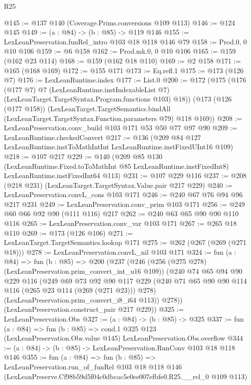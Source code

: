 \begin{lexlean}{R25}
\begin{coremodule}
@145 := @137 @140 (Coverage.Prims.conversions @109 @113)
@146 := @124 @145
@149 := (a : @84) -> (b : @85) -> @119 @146
@155 := LexLeanPreservation.funRel_intro @103 @18 @118 @146 @79
@158 := Prod.{0, 0} @10 @106
@159 := @6 @158
@162 := Prod.mk.{0, 0} @10 @106
@165 := @159 (@162 @23 @114)
@168 := @159 (@162 @18 @110)
@169 := @2 @158
@171 := @165 (@168 @169)
@172 := @155 @171
@173 := Eq.refl.{1}
@175 := @173 (@126 @7)
@176 := LexLeanRuntime.index
@177 := List.{0}
@200 := @172
    (@175
      (@176
        (@177 @7)
        @7
        (LexLeanRuntime.instIndexableList @7)
        (LexLeanTarget.TargetSyntax.Program.functions @103)
        @18))
    (@173
      (@126 (@177 @158))
      (LexLeanTarget.TargetSemantics.bindAll
        (LexLeanTarget.TargetSyntax.Function.parameters @79)
        @118
        @169))
@208 := LexLeanPreservation.conv_build @103 @171 @53 @50 @77 @97 @90
@209 := LexLeanRuntime.checkedConvert
@217 := @136 (@209 @84 @127 LexLeanRuntime.instToMathIntInt LexLeanRuntime.instFixedUInt16 @109)
@218 := @107 @217
@229 := @140
    (@209
      @85
      @130
      (LexLeanRuntime.Fixed.toToMathInt @85 LexLeanRuntime.instFixedInt8)
      LexLeanRuntime.instFixedInt64
      @113)
@231 := @107 @229 @116
@237 := @208 (@218 @231) (LexLeanTarget.TargetSyntax.Value.pair @217 @229)
@240 := LexLeanPreservation.convL_cons @103 @171
@246 := @240 @67 @76 @94 @96 @217 @231
@249 := LexLeanPreservation.conv_prim @103 @171
@256 := @249 @60 @66 @92 @90 (@111 @116) @217
@262 := @240 @63 @65 @90 @90 @110 @116
@265 := LexLeanPreservation.conv_var @103 @171
@267 := @265 @18 @110
@269 := @173 (@126 @106)
@271 := LexLeanTarget.TargetSemantics.lookup @171
@275 := @262 (@267 (@269 (@271 @18)))
@278 := LexLeanPreservation.convL_nil @103 @171
@324 := fun (a : @84) =>
  fun (b : @85) =>
  @200
    (@237
      (@246
        (@256 (@275 @278) (LexLeanPreservation.prim_convert_int_u16 @109))
        (@240
          @74
          @65
          @94
          @90
          @229
          @116
          (@249
            @69
            @73
            @92
            @90
            @117
            @229
            (@240 @71 @65 @90 @90 @114 @116 (@265 @23 @114 (@269 (@271 @23))) @278)
            (LexLeanPreservation.prim_convert_i8_i64 @113))
          @278))
      (LexLeanPreservation.construct_pair @217 @229))
@325 := LexLeanPreservation.Obs
@327 := (a : @84) -> (b : @85) -> @325
@337 := fun (a : @84) =>
  fun (b : @85) =>
  cond.{1} @325 @123 (LexLeanPreservation.Obs.value @145) LexLeanPreservation.Obs.overflow
@344 := (a : @84) -> (b : @85) -> LexLeanPreservation.RunConv @103 @18 @118 @146
@355 := fun (a : @84) =>
  fun (b : @85) =>
  LexLeanPreservation.run_of_funRel
    @103
    @18
    @118
    @146
    (LexLeanPreserve.Cf98b59d5f04c0dbcac5e0ee007efbfe0.R25.__rel_0 @109 @113)
\end{coremodule}
\end{lexlean}
